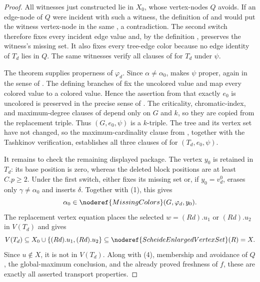 \begin{proof}
All witnesses just constructed lie in $X_0$, whose vertex-nodes $Q$
avoids.  If an edge-node of $Q$ were incident with such a witness, the
definition of  and
 would put the witness vertex-node in the same
, a contradiction.  The second switch
therefore fixes every incident edge value and, by the definition
, preserves the witness's missing set.  It also
fixes every tree-edge color because no edge identity of $T_d$ lies in
$Q$.  The same witnesses verify all clauses of
 for $T_d$ under $\psi$.

The theorem  supplies properness of
$\varphi_d$.
Since $\alpha\ne\alpha_0$,
 makes $\psi$ proper, again in the
sense of .  The defining branches of
 fix the uncolored value and map every
colored value to a colored value.  Hence the assertion from
 that exactly $e_0$ is uncolored is
preserved in the precise sense of .  The
criticality, chromatic-index, and maximum-degree clauses of
 depend only on $G$ and $k$, so they are copied from the
replacement triple.  Thus $(G,e_0,\psi)$ is a $k$-triple.  The tree and
its vertex set have not changed, so the maximum-cardinality clause from
, together with the Tashkinov
verification, establishes all three clauses of
 for $(T_d,e_0,\psi)$.

It remains to check the remaining displayed package.  The vertex $y_0$
is retained in $T_d$: its base position is zero, whereas the deleted block
positions are at least $C.p\ge2$.  Under the first switch,
 either fixes its missing set or,
if $y_0=v^0_d$, erases only $\gamma\ne\alpha_0$ and inserts $\delta$.
Together with (1), this gives
\[
 \alpha_0\in\noderef{MissingColors}(G,\varphi_d,y_0).
\]
The replacement vertex equation places the selected
$w=(R d).u_1$ or $(R d).u_2$ in $V(T_d)$ and gives
\[
 V(T_d)\subseteq X_0\cup\{(R d).u_1,(R d).u_2\}
             \subseteq\noderef{ScheideEnlargedVertexSet}(R)=X.
\]
Since $u\notin X$, it is not in $V(T_d)$.  Along with (4), membership and
avoidance of $Q$, the global-maximum conclusion, and the already proved
freshness of $f$, these are exactly all asserted transport properties.
\end{proof}
